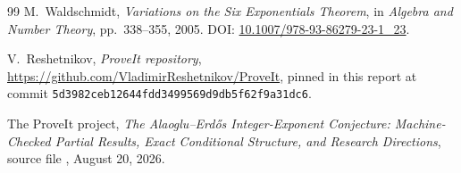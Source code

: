 \documentclass[11pt,oneside]{article}
\theoremstyle{definition}
\theoremstyle{remark}
\newcommand{\commit}[1]{\texttt{#1}}
\begin{document}
\begin{thebibliography}{99}
M.~Waldschmidt,
\newblock \emph{Variations on the Six Exponentials Theorem},
\newblock in \emph{Algebra and Number Theory}, pp.~338--355, 2005.
\newblock DOI: \href{https://doi.org/10.1007/978-93-86279-23-1_23}{10.1007/978-93-86279-23-1\_23}.

V.~Reshetnikov,
\newblock \emph{ProveIt repository},
\newblock \url{https://github.com/VladimirReshetnikov/ProveIt},
\newblock pinned in this report at commit
\commit{5d3982ceb12644fdd3499569d9db5f62f9a31dc6}.

The ProveIt project,
\newblock \emph{The Alaoglu--Erd\H{o}s Integer-Exponent Conjecture: Machine-Checked Partial
Results, Exact Conditional Structure, and Research Directions},
\newblock source file
,
August 20, 2026.

\end{thebibliography}
\end{document}
